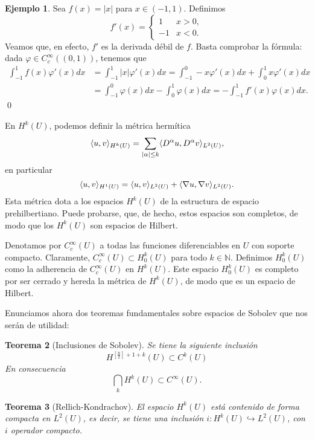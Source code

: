 \documentclass[12pt,a4paper]{article}
\newtheorem{thm}{Teorema}[section]
\theoremstyle{definition} \newtheorem{defn}[thm]{Definición}
\theoremstyle{definition} \newtheorem{ejemplo}[thm]{Ejemplo}
\theoremstyle{definition} \newtheorem{ejercicio}[thm]{Ejercicio}
\theoremstyle{remark} \newtheorem*{obs}{Observación}
\DeclarePairedDelimiter\esc{\langle}{\rangle}
\newcommand{\NN}{\mathbb{N}}
\begin{document}
\begin{ejemplo}
  Sea $f(x)=|x|$ para $x\in (-1,1)$. Definimos
  \begin{equation*}
    f'(x)=
    \begin{cases}
      1 & x >0, \\
      -1 & x<0.
    \end{cases}
  \end{equation*}
  Veamos que, en efecto, $f'$ es la derivada débil de $f$. Basta comprobar la fórmula: dada $\varphi \in C^{\infty}_c((0,1))$, tenemos que
  \begin{align*}
    \int_{-1}^1 f(x) \varphi'(x) dx & = \int_{-1}^1 |x| \varphi'(x) dx = \int_{-1}^0 -x\varphi'(x) dx + \int_0^1 x \varphi'(x) dx \\ & = \int_{-1}^0 \varphi(x) dx - \int_0^1 \varphi(x) dx = -\int_{-1}^1 f'(x) \varphi(x) dx.
  \end{align*}
  \qed
\end{ejemplo}

  En $H^k(U)$, podemos definir la métrica hermítica
  \begin{equation*}
    \esc{u,v}_{H^k(U)}=\sum_{|\alpha|\leq k} \esc{D^\alpha u, D^\alpha v}_{L^2(U)},   
  \end{equation*}
  en particular
  \begin{equation*}
    \esc{u,v}_{H^1(U)}=\esc{u,v}_{L^2(U)}+\esc{\nabla u, \nabla v}_{L^2(U)}.
  \end{equation*}
  Esta métrica dota a los espacios $H^k(U)$ de la estructura de espacio prehilbertiano. Puede probarse, que, de hecho, estos espacios son completos, de modo que los $H^k(U)$ son espacios de Hilbert.

  Denotamos por $C^\infty_c(U)$ a todas las funciones diferenciables en $U$ con soporte compacto. Claramente, $C^\infty_c(U) \subset H^k_0(U)$ para todo $k\in \NN$. Definimos $H^k_0(U)$ como la adherencia de $C^\infty_c(U)$ en $H^k(U)$. Este espacio $H^k_0(U)$ es completo por ser cerrado y hereda la métrica de $H^k(U)$, de modo que es un espacio de Hilbert.

  Enunciamos ahora dos teoremas fundamentales sobre espacios de Sobolev que nos serán de utilidad:
  \begin{thm}[Inclusiones de Sobolev]
    Se tiene la siguiente inclusión
    \begin{equation*}
      H^{\left[ \frac{n}{2} \right]+1+k}(U) \subset C^k(U)
    \end{equation*}
    En consecuencia
    \begin{equation*}
      \bigcap_{k} H^k(U) \subset C^{\infty}(U).
    \end{equation*}
  \end{thm}
  \begin{thm}[Rellich-Kondrachov]
    El espacio $H^k(U)$ está \emph{contenido de forma compacta} en $L^2(U)$, es decir, se tiene una inclusión
$i:	H^k(U) \hookrightarrow L^2(U)$,
    con $i$ operador compacto.
  \end{thm}
\end{document}
